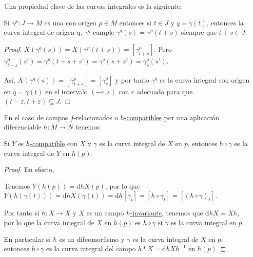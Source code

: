 \documentclass[../VD_completo.tex]{subfiles}
\begin{document}
Una propiedad clave de las curvas integrales es la siguiente:

\begin{lemma}
  \label{lem:ci-traslacion}
  Si \(\gamma^{p} \colon J \to M\) es una  con
  origen \(p \in M\) entonces si \(t \in J\) y \(q = \gamma(t)\), entonces la
  curva integral de origen q, \(\gamma^{q}\) cumple \(\gamma^{q}(s) =
  \gamma^{p}(t+s)\) siempre que \(t + s \in J\).
\end{lemma}

\begin{proof}
  \(X(\gamma^{q}(s)) = X(\gamma^{p}(t+s)) = [\gamma^{p}_{t+s}]\). Pero
  \(\gamma^{p}_{t+s}(s') = \gamma^{p}(t+s+s') = \gamma^{q}(s+s') =
  \gamma^{q}_{s}(s')\).

  Así, \(X(\gamma^{q}(s)) = [\gamma^{p}_{t+s}] = [\gamma^{q}_{s}]\) y por tanto
  \(\gamma^{q}\) es la curva integral con origen en \(q = \gamma(t)\) en el
  intervalo \((-\varepsilon, \varepsilon)\) con \(\varepsilon\) adecuado para
  que \((t - \varepsilon, t + \varepsilon) \subseteq J\).
\end{proof}

En el caso de campos \(f\)-relacionados o
\hyperref[def:f-comp]{\(h\)-compatibles}
por una aplicación diferenciable \(h \colon M \to N\) tenemos

\begin{lemma}
  Si \(Y\) es \hyperref[def:f-comp]{\(h\)-compatible} con \(X\) y \(\gamma\) es
  la curva integral de \(X\) en \(p\), entonces \(h \circ \gamma\) es la curva
  integral de \(Y\) en \(h(p)\).
\end{lemma}

\begin{proof}
  En efecto,

  \begin{center}
  \end{center}

  Tenemos \(Y(h(p)) = \mathrm{d} h X(p)\), por lo que \(Y(h(\gamma(t))) =
  \mathrm{d} h X(\gamma(t)) = \mathrm{d} h [\gamma_{t}] = [h \circ \gamma_{t}] =
  [ (h \circ \gamma)_{t}]\).

  Por tanto si \(h \colon X \to X\) y \(X\) es un campo
  \hyperref[def:f-invariante]{\(h\)-invariante}, tenemos que \(\mathrm{d} h X =
  X h\), por lo que la curva integral de \(X\) en \(h(p)\) es \(h \circ \gamma\)
  si \(\gamma\) es la curva integral en \(p\).

  En particular si \(h\) es un difeomorfismo y \(\gamma\) es la curva integral
  de \(X\) en \(p\), entonces \(h \circ \gamma\) es la curva integral del campo
  \(h * X = \mathrm{d} h X h^{-1}\) en \(h(p)\)
\end{proof}
\end{document}
